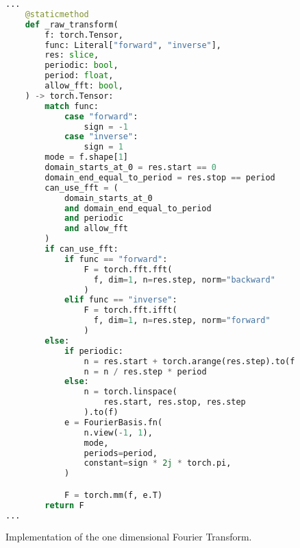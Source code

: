 \begin{figure}[H]
  \centering
  \begin{lstlisting}[language=Python]
...
    @staticmethod
    def _raw_transform(
        f: torch.Tensor,
        func: Literal["forward", "inverse"],
        res: slice,
        periodic: bool,
        period: float,
        allow_fft: bool,
    ) -> torch.Tensor:
        match func:
            case "forward":
                sign = -1
            case "inverse":
                sign = 1
        mode = f.shape[1]
        domain_starts_at_0 = res.start == 0
        domain_end_equal_to_period = res.stop == period
        can_use_fft = (
            domain_starts_at_0
            and domain_end_equal_to_period
            and periodic
            and allow_fft
        )
        if can_use_fft:
            if func == "forward":
                F = torch.fft.fft(
                  f, dim=1, n=res.step, norm="backward"
                )
            elif func == "inverse":
                F = torch.fft.ifft(
                  f, dim=1, n=res.step, norm="forward"
                )
        else:
            if periodic:
                n = res.start + torch.arange(res.step).to(f)
                n = n / res.step * period
            else:
                n = torch.linspace(
                    res.start, res.stop, res.step
                ).to(f)
            e = FourierBasis.fn(
                n.view(-1, 1),
                mode,
                periods=period,
                constant=sign * 2j * torch.pi,
            )

            F = torch.mm(f, e.T)
        return F
...
  \end{lstlisting}
  \caption{Implementation of the one dimensional Fourier Transform.}\label{fig:1d_fourier_transform_impl}
\end{figure}

